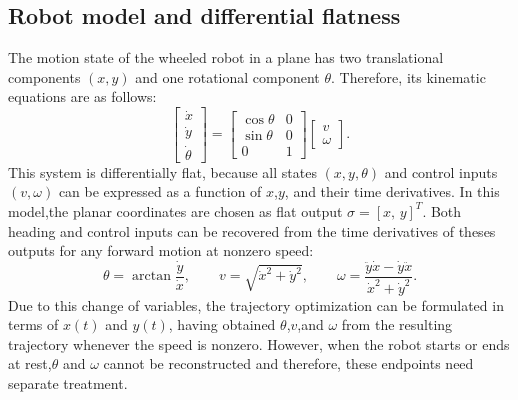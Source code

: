 \begin{center}
{%
}
\end{center}

\subsection{Robot model and differential flatness}
\label{sec:flatness}
The motion state of the wheeled robot in a plane has two translational components $(x,y)$ and one rotational component \( \theta \). Therefore, its kinematic equations are as follows:
\begin{equation}
\begin{bmatrix}
    \dot{x} \\
    \dot{y} \\
    \dot{\theta}
\end{bmatrix}
=
\begin{bmatrix}
    \cos\theta & 0 \\
    \sin\theta & 0 \\
    0          & 1
\end{bmatrix}
\begin{bmatrix}
    v \\
    \omega
\end{bmatrix}.
\label{eq:robot_kinematics}
\end{equation}
This system is differentially flat, because all states $(x,y,\theta)$ and control inputs $(v,\omega)$ can be expressed as a function of $x$,$y$, and their time derivatives.
In this model,the planar coordinates are chosen as flat output $\sigma = [x,\,y]^T$.
Both heading and control inputs can be recovered from the time derivatives of theses outputs for any forward motion at nonzero speed:
\begin{equation}
\theta = \arctan\frac{\dot{y}}{\dot{x}}, \qquad
v = \sqrt{\dot{x}^2+\dot{y}^2}, \qquad
\omega = \frac{\ddot{y}\dot{x}-\dot{y}\ddot{x}}{\dot{x}^2+\dot{y}^2}.
\label{eq:flatness}
\end{equation}
Due to this change of variables, the trajectory optimization can be formulated in terms of $x(t)$ and $y(t)$, having obtained $\theta$,$v$,and $\omega$ from the resulting trajectory whenever the speed is nonzero. However, when the robot starts or ends at rest,$\theta$ and $\omega$ cannot be reconstructed and therefore, these endpoints need separate treatment.

